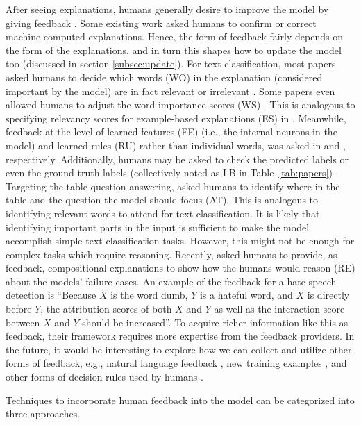 After seeing explanations, 
humans generally desire to improve the model by giving feedback .
Some existing work asked humans to confirm or correct machine-computed explanations.
Hence, the form of feedback fairly depends on the form of the explanations,
and in turn this shapes how to update the model too (discussed in section \ref{subsec:update}).
For text classification, 
most \EBHD papers asked humans to decide which words (WO) in the explanation (considered important by the model) are in fact relevant or irrelevant .
Some papers even allowed humans to adjust the word importance scores (WS) .
This is analogous to specifying relevancy scores for example-based explanations (ES) in .
Meanwhile, feedback at the level of learned features (FE) (i.e., the internal neurons in the model) and learned rules (RU) rather than individual words, was asked in   and , respectively.
Additionally, humans may be asked to check the predicted labels  or even the ground truth labels (collectively noted as LB in Table~\ref{tab:papers}) . 
Targeting the table question answering,  asked humans to identify where in the table and the question the model should focus (AT). This is analogous to identifying relevant words to attend for text classification.
It is likely that identifying important parts in the input is sufficient to make the model accomplish simple text classification tasks.
However, this might not be enough for complex tasks which require reasoning. 
Recently,  asked humans to provide, as feedback, compositional explanations 
to show how the humans would reason (RE) about the models’ failure cases.
An example of the feedback for a hate speech detection is ``Because $X$ is the word dumb, $Y$ is a hateful word, and $X$ is directly before $Y$, the attribution scores of both $X$ and $Y$ as well as the interaction score between $X$ and $Y$ should be increased''.
To acquire richer information like this as
feedback, their framework requires more expertise from the feedback providers.
In the future, it would be interesting to explore how we can collect and utilize other forms of feedback, e.g., natural language feedback , 
new training examples , and other forms of decision rules used by humans .

\label{subsec:update}
Techniques to incorporate human feedback into the model can be categorized into three approaches.

